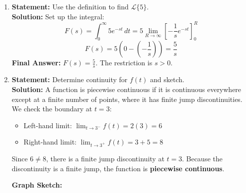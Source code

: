 \documentclass[11pt, letterpaper]{article}
\theoremstyle{definition}
\theoremstyle{remark}
\begin{document}
\begin{enumerate}[label=\textbf{Solution \arabic*.}, leftmargin=*]
    \item \textbf{Statement:} Use the definition to find $\mathscr{L}\{5\}$.\\
    \textbf{Solution:} Set up the integral:
    \[
    F(s) = \int_0^\infty 5e^{-st}\,dt = 5 \lim_{R \to \infty} \left[ -\frac{1}{s} e^{-st} \right]_0^R
    \]
    \[
    F(s) = 5 \left( 0 - \left(-\frac{1}{s}\right) \right) = \frac{5}{s}
    \]
    \textbf{Final Answer:} $F(s) = \frac{5}{s}$. The restriction is $s > 0$.

    \item \textbf{Statement:} Determine continuity for $f(t)$ and sketch.\\
    \textbf{Solution:} A function is piecewise continuous if it is continuous everywhere except at a finite number of points, where it has finite jump discontinuities. We check the boundary at $t = 3$:
    \begin{itemize}
        \item Left-hand limit: $\lim_{t \to 3^-} f(t) = 2(3) = 6$
        \item Right-hand limit: $\lim_{t \to 3^+} f(t) = 3 + 5 = 8$
    \end{itemize}
    Since $6 \neq 8$, there is a finite jump discontinuity at $t = 3$. Because the discontinuity is a finite jump, the function is \textbf{piecewise continuous}.
    
    \textbf{Graph Sketch:}
    \begin{center}
\end{center}
\end{enumerate}
\end{document}
